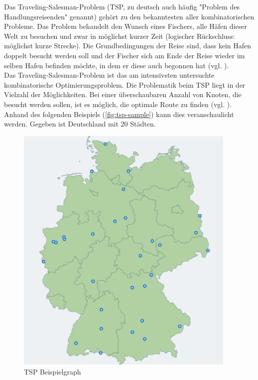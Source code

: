 \documentclass[12pt,a4paper]{scrreprt}
\newcommand{\absatz}{\\[12pt]}
\begin{document}
Das Traveling-Salesman-Problem (TSP, zu deutsch auch häufig "Problem des Handlungsreisenden" genannt) gehört zu den bekanntesten aller kombinatorischen Probleme. Das Problem behandelt den Wunsch eines Fischers, alle Häfen dieser Welt zu besuchen und zwar in möglichst kurzer Zeit (logischer Rückschluss: möglichst kurze Strecke). Die Grundbedingungen der Reise sind, dass kein Hafen doppelt besucht werden soll und der Fischer sich am Ende der Reise wieder im selben Hafen befinden möchte, in dem er diese auch begonnen hat (vgl. \cite{groetschel05}).\absatz
Das Traveling-Salesman-Problem ist das am intensivsten untersuchte kombinatorische Optimierungsproblem. Die Problematik beim TSP liegt in der Vielzahl der Möglichkeiten. Bei einer überschaubaren Anzahl von Knoten, die besucht werden sollen, ist es möglich, die optimale Route zu finden (vgl. \cite{groetschel05}). Anhand des folgenden Beispiels (\autoref{fig:tsp-sample}) kann dies veranschaulicht werden. Gegeben ist Deutschland mit 20 Städten. 
\pagebreak

\begin{figure}[ht]
  	\centering
	\includegraphics[width=300pt]{images/tsp_sample.png}
	\caption{TSP Beispielgraph\protect\footnotemark}
	\label{fig:tsp-sample}
\end{figure}
\end{document}
